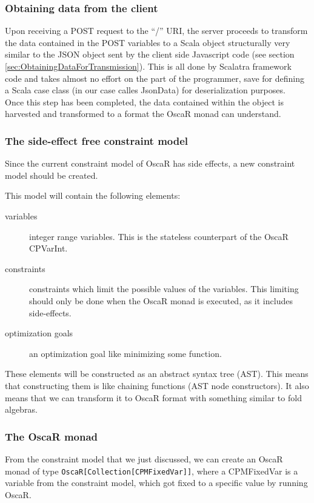 \documentclass[a4paper]{article}
\begin{document}
\subsubsection{Obtaining data from the client}
\label{sec:ObtainingDataFromTheClient}

Upon receiving a POST request to the ``/'' URI, the server
proceeds to transform the data contained in the POST variables to a
Scala object structurally very similar to the JSON object sent by the
client side Javascript code (see section
\ref{sec:ObtainingDataForTransmission}). This is all done by Scalatra framework
code and takes almost no effort on the part of the programmer, save
for defining a Scala case class (in our case calles JsonData) for
deserialization purposes.\\

Once this step has been completed, the data contained within the
object is harvested and transformed to a format the OscaR monad can
understand.

\subsubsection{The side-effect free constraint model}
Since the current constraint model of OscaR has side effects,
a new constraint model should be created.

This model will contain the following elements:
\begin{description}
	\item[variables] integer range variables.
	This is the stateless counterpart of the OscaR CPVarInt.
	\item[constraints] constraints which limit the possible values of the variables.
	This limiting should only be done when the OscaR monad is executed,
	as it includes side-effects.
	\item[optimization goals] an optimization goal like minimizing some function.
\end{description}
These elements will be constructed as an abstract syntax tree (AST).
This means that constructing them is like chaining functions (AST node constructors). 
It also means that we can transform it to OscaR format with something similar to fold algebras.

\subsubsection{The OscaR monad}
From the constraint model that we just discussed, we can create an OscaR monad of type 
\verb|OscaR[Collection[CPMFixedVar]]|, 
where a CPMFixedVar is a variable from the constraint model, 
which got fixed to a specific value by running OscaR.
\end{document}
